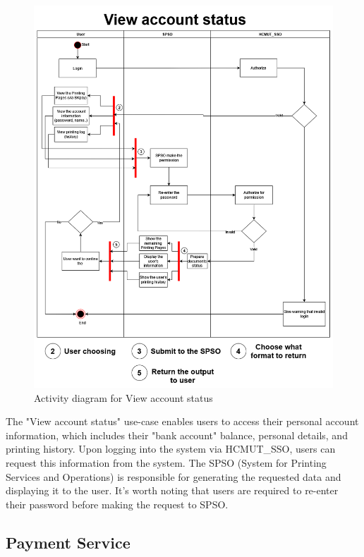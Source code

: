 \begin{figure}[H]
\centering
  \includegraphics[max width=0.9\linewidth,origin = c]{chapters/4. system-modeling/activity/view account_acitivty.png}
  \caption{Activity diagram for View account status}%
\end{figure}

The "View account status" use-case enables users to access their personal account information, which includes their "bank account" balance, personal details, and printing history. Upon logging into the system via HCMUT\_SSO, users can request this information from the system. The SPSO (System for Printing Services and Operations) is responsible for generating the requested data and displaying it to the user. It's worth noting that users are required to re-enter their password before making the request to SPSO.

\subsection{Payment Service}

